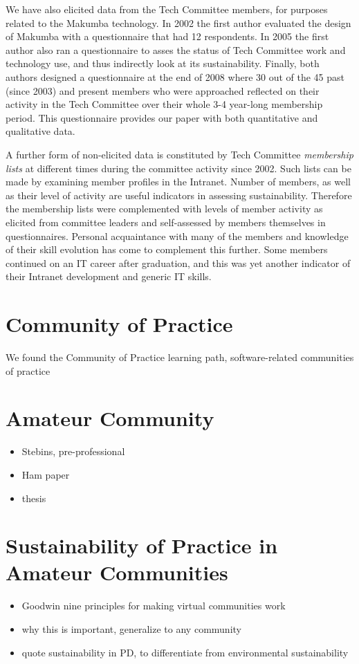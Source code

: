 \documentclass{acm_proc_article-sp}
\begin{document}
We have also elicited data from the Tech Committee members, for purposes related to the Makumba technology. In 2002 the first author evaluated the design of Makumba with a questionnaire that had 12 respondents. In 2005 the first author also ran a questionnaire
to asses the status of Tech Committee work and technology use, and thus indirectly look at its sustainability. Finally, both authors designed a questionnaire at the end of 2008 where 30 out of the 45 past (since 2003) and present members who were approached reflected on their activity in the Tech Committee over their whole 3-4 year-long membership period. This questionnaire provides our paper with both quantitative and qualitative data. 

A further form of non-elicited data is constituted by Tech Committee {\it membership lists} at different times during the committee activity since 2002. Such lists can be made by examining member profiles in the Intranet. Number of members, as well as their level of activity are useful indicators in assessing sustainability. Therefore the membership lists were complemented with levels of member activity as elicited from committee leaders and self-assessed by members themselves in questionnaires. Personal acquaintance with many of the members and knowledge of their skill evolution has come to complement this further. Some members continued on an IT career after graduation, and this was yet another indicator of their Intranet development and generic IT skills.

\section{Community of Practice}\label{sec:cop}
We found the Community of Practice 
learning path, software-related communities of practice

\section{Amateur Community}\label{sec:amateur}
\begin{itemize}
\item Stebins, pre-professional
\item Ham paper
\item thesis
\end{itemize}

\section{Sustainability of Practice in Amateur Communities}\label{sec:sust}
\begin{itemize}
\item Goodwin nine principles for making virtual communities work
\item why this is important, generalize to any community
\item quote sustainability in PD, to differentiate from environmental sustainability
\end{itemize}
\end{document}
